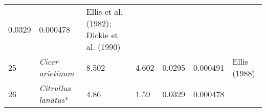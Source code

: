 \documentclass[]{article}
\begin{document}
\begin{longtable}[]{@{}lllllll@{}}
\begin{minipage}[t]{0.08\columnwidth}
0.0329\strut
\end{minipage} & \begin{minipage}[t]{0.08\columnwidth}\raggedright
0.000478\strut
\end{minipage} & \begin{minipage}[t]{0.23\columnwidth}\raggedright
Ellis et al. (1982); Dickie et al. (1990)\strut
\end{minipage}\tabularnewline
\begin{minipage}[t]{0.05\columnwidth}\raggedright
25\strut
\end{minipage} & \begin{minipage}[t]{0.23\columnwidth}\raggedright
\emph{Cicer arietinum}\strut
\end{minipage} & \begin{minipage}[t]{0.05\columnwidth}\raggedright
8.502\strut
\end{minipage} & \begin{minipage}[t]{0.08\columnwidth}\raggedright
4.602\strut
\end{minipage} & \begin{minipage}[t]{0.08\columnwidth}\raggedright
0.0295\strut
\end{minipage} & \begin{minipage}[t]{0.08\columnwidth}\raggedright
0.000491\strut
\end{minipage} & \begin{minipage}[t]{0.23\columnwidth}\raggedright
Ellis (1988)\strut
\end{minipage}\tabularnewline
\begin{minipage}[t]{0.05\columnwidth}\raggedright
26\strut
\end{minipage} & \begin{minipage}[t]{0.23\columnwidth}\raggedright
\emph{Citrullus lanatus}*\strut
\end{minipage} & \begin{minipage}[t]{0.05\columnwidth}\raggedright
4.86\strut
\end{minipage} & \begin{minipage}[t]{0.08\columnwidth}\raggedright
1.59\strut
\end{minipage} & \begin{minipage}[t]{0.08\columnwidth}\raggedright
0.0329\strut
\end{minipage} & \begin{minipage}[t]{0.08\columnwidth}\raggedright
0.000478\strut
\end{minipage} & \begin{minipage}[t]{0.23\columnwidth}\raggedright

\end{minipage}
\end{longtable}
\end{document}
